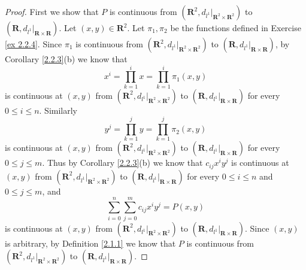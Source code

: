 \begin{proof}
    First we show that \(P\) is continuous from \((\mathbf{R}^2, d_{l^1}|_{\mathbf{R}^2 \times \mathbf{R}^2})\) to \((\mathbf{R}, d_{l^1}|_{\mathbf{R} \times \mathbf{R}})\).
    Let \((x, y) \in \mathbf{R}^2\).
    Let \(\pi_1, \pi_2\) be the functions defined in Exercise \ref{ex 2.2.4}.
    Since \(\pi_1\) is continuous from \((\mathbf{R}^2, d_{l^1}|_{\mathbf{R}^2 \times \mathbf{R}^2})\) to \((\mathbf{R}, d_{l^1}|_{\mathbf{R} \times \mathbf{R}})\), by Corollary \ref{2.2.3}(b) we know that
    \[
        x^i = \prod_{k = 1}^i x = \prod_{k = 1}^i \pi_1(x, y)
    \]
    is continuous at \((x, y)\) from \((\mathbf{R}^2, d_{l^1}|_{\mathbf{R}^2 \times \mathbf{R}^2})\) to \((\mathbf{R}, d_{l^1}|_{\mathbf{R} \times \mathbf{R}})\) for every \(0 \leq i \leq n\).
    Similarly
    \[
        y^j = \prod_{k = 1}^j y = \prod_{k = 1}^j \pi_2(x, y)
    \]
    is continuous at \((x, y)\) from \((\mathbf{R}^2, d_{l^1}|_{\mathbf{R}^2 \times \mathbf{R}^2})\) to \((\mathbf{R}, d_{l^1}|_{\mathbf{R} \times \mathbf{R}})\) for every \(0 \leq j \leq m\).
    Thus by Corollary \ref{2.2.3}(b) we know that \(c_{ij} x^i y^j\) is continuous at \((x, y)\) from \((\mathbf{R}^2, d_{l^1}|_{\mathbf{R}^2 \times \mathbf{R}^2})\) to \((\mathbf{R}, d_{l^1}|_{\mathbf{R} \times \mathbf{R}})\) for every \(0 \leq i \leq n\) and \(0 \leq j \leq m\), and
    \[
        \sum_{i = 0}^n \sum_{j = 0}^m c_{ij} x^i y^j = P(x, y)
    \]
    is continuous at \((x, y)\) from \((\mathbf{R}^2, d_{l^1}|_{\mathbf{R}^2 \times \mathbf{R}^2})\) to \((\mathbf{R}, d_{l^1}|_{\mathbf{R} \times \mathbf{R}})\).
    Since \((x, y)\) is arbitrary, by Definition \ref{2.1.1} we know that \(P\) is continuous from \((\mathbf{R}^2, d_{l^1}|_{\mathbf{R}^2 \times \mathbf{R}^2})\) to \((\mathbf{R}, d_{l^1}|_{\mathbf{R} \times \mathbf{R}})\).


\end{proof}
